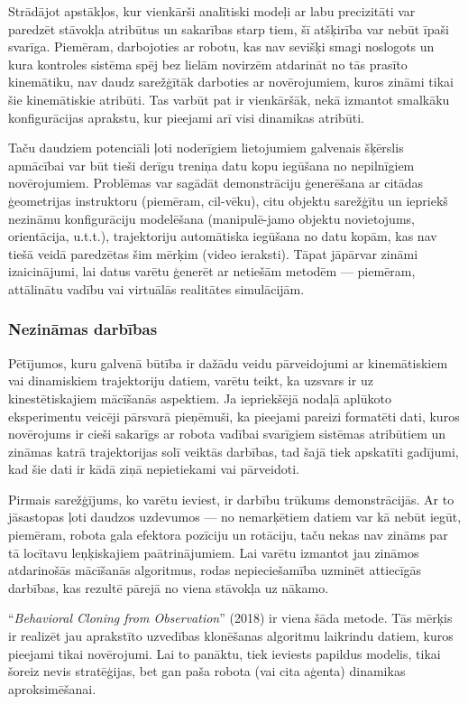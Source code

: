 \documentclass[12pt, a4paper]{article}
\numberwithin{equation}{section} %
\begin{document}
Strādājot apstākļos, kur vienkārši analītiski modeļi ar labu precizitāti var paredzēt stāvokļa atribūtus un sakarības starp tiem, šī atšķirība var nebūt īpaši svarīga. Piemēram, darbojoties ar robotu, kas nav sevišķi smagi noslogots un kura kontroles sistēma spēj bez lielām novirzēm atdarināt no tās prasīto kinemātiku, nav daudz sarežģītāk darboties ar novērojumiem, kuros zināmi tikai šie kinemātiskie atribūti. Tas varbūt pat ir vienkāršāk, nekā izmantot smalkāku konfigurācijas aprakstu, kur pieejami arī visi dinamikas atribūti. 

Taču daudziem potenciāli ļoti noderīgiem lietojumiem galvenais šķērslis apmācībai var būt tieši derīgu treniņa datu kopu iegūšana no nepilnīgiem novērojumiem. Problēmas var sagādāt demonstrāciju ģenerēšana ar citādas ģeometrijas instruktoru (piemēram, cil-vēku), citu objektu sarežģītu un iepriekš nezināmu konfigurāciju modelēšana (manipulē-jamo objektu novietojums, orientācija, u.t.t.), trajektoriju automātiska iegūšana no datu kopām, kas nav tiešā veidā paredzētas šim mērķim (video ieraksti). Tāpat jāpārvar zināmi izaicinājumi, lai datus varētu ģenerēt ar netiešām metodēm --- piemēram, attālinātu vadību vai virtuālās realitātes simulācijām.

\subsubsection{Nezināmas darbības}

Pētījumos, kuru galvenā būtība ir dažādu veidu pārveidojumi ar kinemātiskiem vai dinamiskiem trajektoriju datiem, varētu teikt, ka uzsvars ir uz kinestētiskajiem mācīšanās aspektiem. Ja iepriekšējā nodaļā aplūkoto eksperimentu veicēji pārsvarā pieņēmuši, ka pieejami pareizi formatēti dati, kuros novērojums ir cieši sakarīgs ar robota vadībai svarīgiem sistēmas atribūtiem un zināmas katrā trajektorijas solī veiktās darbības, tad šajā tiek apskatīti gadījumi, kad šie dati ir kādā ziņā nepietiekami vai pārveidoti.

Pirmais sarežģījums, ko varētu ieviest, ir darbību trūkums demonstrācijās. Ar to jāsastopas ļoti daudzos uzdevumos --- no nemarķētiem datiem var kā nebūt iegūt, piemēram, robota gala efektora pozīciju un rotāciju, taču nekas nav zināms par tā locītavu leņķiskajiem paātrinājumiem. Lai varētu izmantot jau zināmos atdarinošās mācīšanās algoritmus, rodas nepieciešamība uzminēt attiecīgās darbības, kas rezultē pārejā no viena stāvokļa uz nākamo.

``\textit{Behavioral Cloning from Observation}'' \cite{torabi2018behavioral} (2018) ir viena šāda metode. Tās mērķis ir realizēt jau aprakstīto uzvedības klonēšanas algoritmu laikrindu datiem, kuros pieejami tikai novērojumi. Lai to panāktu, tiek ieviests papildus modelis, tikai šoreiz nevis stratēģijas, bet gan paša robota (vai cita aģenta) dinamikas aproksimēšanai.
\end{document}
